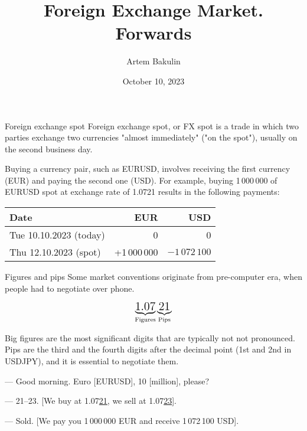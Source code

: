 \documentclass{beamer}
\title{Foreign Exchange Market. Forwards}
\author{Artem Bakulin}
\date{October 10, 2023}
\begin{document}
\begin{frame}
\titlepage
\end{frame}



\begin{frame}{Foreign exchange spot}
\justify
\alert{Foreign exchange spot, or FX spot} is a trade in which two parties exchange two currencies "almost immediately" ("on the spot"), usually on the second business day.

\justify
Buying a currency pair, such as EURUSD, involves receiving the first currency (EUR) and paying the second one (USD). For example, buying 1\,000\,000 of EURUSD spot at exchange rate of 1.0721 results in the following payments:
\justify

\centering
\begin{tabular}{l|r|r}
Date                          & EUR & USD \\ \hline
Tue 10.10.2023 (today)  & 0   & 0   \\
Thu 12.10.2023 (spot)     & +1\,000\,000 & $-1\,072\,100$
\end{tabular}
\end{frame}



\begin{frame}{Figures and pips}
\justify
Some market conventions originate from pre-computer era, when people had to negotiate
over phone.

\begin{align*}
\underbrace{\text{\Large 1.07}}_{\text{Figures}}\underbrace{\text{\Large 21}}_{\text{Pips}}
\end{align*}
\justify

\alert{Big figures} are  the most significant digits that are typically not not pronounced. \alert{Pips} are the third and the fourth digits after the decimal point (1st and 2nd in USDJPY), and it is essential to negotiate them.

\justify
--- Good morning. Euro [EURUSD], 10 [million], please?

--- 21--23. [We buy at 1.07\underline{21}, we sell at 1.07\underline{23}].

--- Sold. [We pay you 1\,000\,000 EUR and receive 1\,072\,100 USD].
\end{frame}
\end{document}
